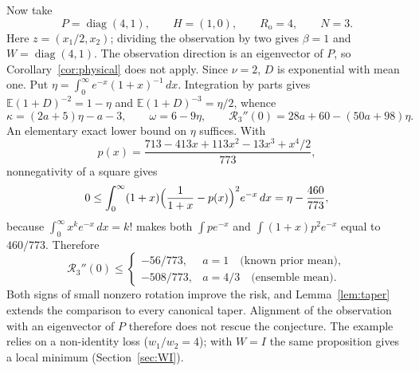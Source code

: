 \documentclass[11pt,a4paper]{article}
\numberwithin{equation}{section}
\theoremstyle{remark}\newtheorem{remark}[theorem]{Remark}
\newcommand{\E}{\mathbb E}
\newcommand{\diag}{\operatorname{diag}}
\newcommand{\risk}{\mathcal R}
\newcommand{\Rn}{R_{\mathrm o}}
\begin{document}
Now take
\begin{equation}\label{eq:aligned}
 P=\diag(4,1),\qquad H=(1,0),\qquad \Rn=4,\qquad N=3 .
\end{equation}
Here \(z=(x_1/2,x_2)\); dividing the observation by two gives \(\beta=1\) and \(W=\diag(4,1)\).
The observation direction is an eigenvector of \(P\), so Corollary~\ref{cor:physical} does not
apply. Since \(\nu=2\), \(D\) is exponential with mean one. Put
\(\eta=\int_0^\infty e^{-x}(1+x)^{-1}\,dx\). Integration by parts gives
\(\E(1+D)^{-2}=1-\eta\) and \(\E(1+D)^{-3}=\eta/2\), whence
\[
 \kappa=(2a+5)\eta-a-3,\qquad \omega=6-9\eta,\qquad
 \risk_3''(0)=28a+60-(50a+98)\eta .
\]
An elementary exact lower bound on \(\eta\) suffices. With
\[
 p(x)=\frac{713-413x+113x^2-13x^3+x^4/2}{773},
\]
nonnegativity of a square gives
\[
 0\le\int_0^\infty(1+x)\Bigl(\frac1{1+x}-p(x)\Bigr)^2e^{-x}\,dx=\eta-\frac{460}{773},
\]
because \(\int_0^\infty x^ke^{-x}\,dx=k!\) makes both \(\int pe^{-x}\) and
\(\int(1+x)p^2e^{-x}\) equal to \(460/773\). Therefore
\begin{equation}\label{eq:alignedbounds}
 \risk_3''(0)\le
 \begin{cases}
 -56/773,&a=1\quad\text{(known prior mean)},\\
 -508/773,&a=4/3\quad\text{(ensemble mean)}.
 \end{cases}
\end{equation}
Both signs of small nonzero rotation improve the risk, and Lemma~\ref{lem:taper} extends the
comparison to every canonical taper. Alignment of the observation with an eigenvector of \(P\)
therefore does not rescue the conjecture. The example relies on a non-identity loss
(\(w_1/w_2=4\)); with \(W=I\) the same proposition gives a local minimum
(Section~\ref{sec:WI}).
\end{document}
